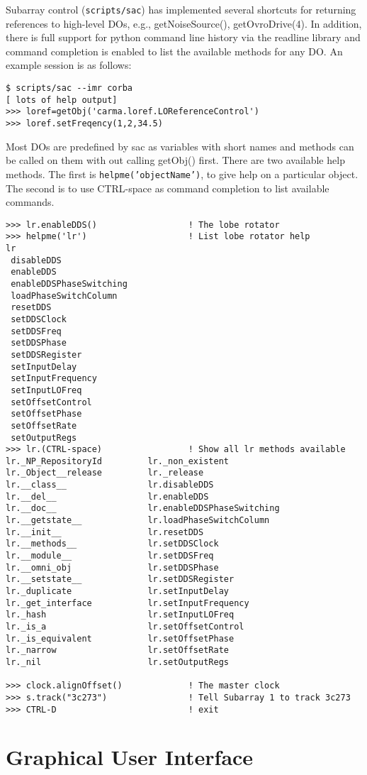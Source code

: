 \documentclass[preprint]{aastex}
\begin{document}
Subarray control ({\tt scripts/sac}) has implemented several shortcuts
for returning references to high-level DOs,
e.g., getNoiseSource(), getOvroDrive(4).  In addition, there is full
support for python command line history via the readline library and
command completion is enabled to list the available methods for any DO.
An example session is as follows:
\begin{verbatim}
$ scripts/sac --imr corba
[ lots of help output]
>>> loref=getObj('carma.loref.LOReferenceControl')
>>> loref.setFreqency(1,2,34.5)
\end{verbatim}
\noindent Most DOs are predefined by sac as variables with short names 
and methods
can be called on them with out calling getObj() first.  There are
two available help methods.  The first is {\tt helpme('objectName')},
to give help on a particular object. The second is to use CTRL-space
as command completion to list available commands.
\begin{verbatim}
>>> lr.enableDDS()                  ! The lobe rotator
>>> helpme('lr')                    ! List lobe rotator help
lr
 disableDDS
 enableDDS
 enableDDSPhaseSwitching
 loadPhaseSwitchColumn
 resetDDS
 setDDSClock
 setDDSFreq
 setDDSPhase
 setDDSRegister
 setInputDelay
 setInputFrequency
 setInputLOFreq
 setOffsetControl
 setOffsetPhase
 setOffsetRate
 setOutputRegs
>>> lr.(CTRL-space)                 ! Show all lr methods available
lr._NP_RepositoryId         lr._non_existent
lr._Object__release         lr._release
lr.__class__                lr.disableDDS
lr.__del__                  lr.enableDDS
lr.__doc__                  lr.enableDDSPhaseSwitching
lr.__getstate__             lr.loadPhaseSwitchColumn
lr.__init__                 lr.resetDDS
lr.__methods__              lr.setDDSClock
lr.__module__               lr.setDDSFreq
lr.__omni_obj               lr.setDDSPhase
lr.__setstate__             lr.setDDSRegister
lr._duplicate               lr.setInputDelay
lr._get_interface           lr.setInputFrequency
lr._hash                    lr.setInputLOFreq
lr._is_a                    lr.setOffsetControl
lr._is_equivalent           lr.setOffsetPhase
lr._narrow                  lr.setOffsetRate
lr._nil                     lr.setOutputRegs

>>> clock.alignOffset()             ! The master clock 
>>> s.track("3c273")                ! Tell Subarray 1 to track 3c273
>>> CTRL-D                          ! exit
\end{verbatim}

\section{Graphical User Interface}
\end{document}
